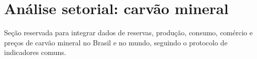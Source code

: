 \section{An\'alise setorial: carv\~ao mineral}

Se\c{c}\~ao reservada para integrar dados de reservas, produ\c{c}\~ao, consumo, com\'ercio e pre\c{c}os de carv\~ao mineral no Brasil e no mundo, seguindo o protocolo de indicadores comuns.
